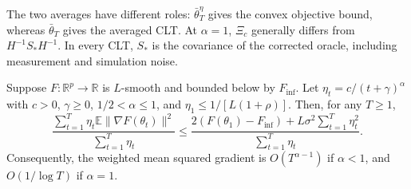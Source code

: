 The two averages have different roles: $\bar\theta_T^\eta$ gives the
convex objective bound, whereas $\bar\theta_T$ gives the averaged CLT.
At $\alpha=1$, $\Xi_c$ generally differs from $H^{-1}S_*H^{-1}$.
In every CLT, $S_*$ is the covariance of the corrected oracle, including
measurement and simulation noise.

\begin{theorem}\label{thm:nonconvex}
Suppose $F:\mathbb R^p\to\mathbb R$ is $L$-smooth and bounded below by
$F_{\inf}$. Let $\eta_t=c/(t+\gamma)^\alpha$ with $c>0$,
$\gamma\ge0$, $1/2<\alpha\le1$, and $\eta_1\le1/[L(1+\rho)]$. Then, for any $T\ge1$,
\[
\frac{\sum_{t=1}^T\eta_t\mathbb E\|\nabla F(\theta_t)\|^2}
{\sum_{t=1}^T\eta_t}
\le
\frac{2(F(\theta_1)-F_{\inf})
+L\sigma^2\sum_{t=1}^T\eta_t^2}
{\sum_{t=1}^T\eta_t}.
\]
Consequently, the weighted mean squared gradient is $O(T^{\alpha-1})$
if $\alpha<1$, and $O(1/\log T)$ if $\alpha=1$.
\end{theorem}


